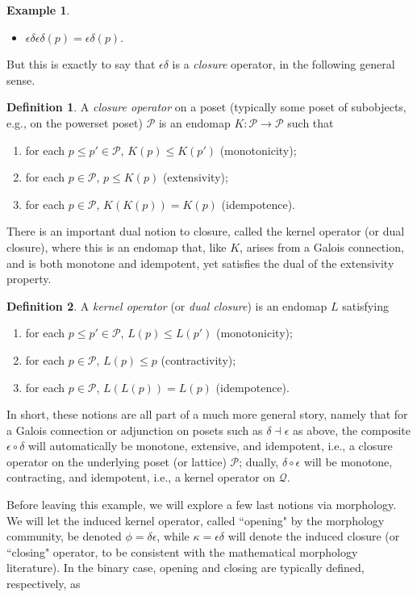 \documentclass[a4paper]{book}
\theoremstyle{definition}
\newtheorem{example}{Example}[section]
\theoremstyle{definition}
\newtheorem{definition}{Definition}[section]
\theoremstyle{definition}
\theoremstyle{theorem}
\theoremstyle{definition}
\begin{document}
\begin{example}
\begin{itemize}
	\item $\epsilon \delta \epsilon \delta (p) = \epsilon \delta (p)$. 
\end{itemize}
But this is exactly to say that $\epsilon \delta$ is a \textit{closure} operator, in the following general sense. 
\begin{definition} 
	A \textit{closure operator} on a poset (typically some poset of subobjects, e.g., on the powerset poset) $\mathcal{P}$ is an endomap $K: \mathcal{P} \rightarrow \mathcal{P}$ such that
	\begin{enumerate}
		\item for each $p \leq p' \in \mathcal{P}$, $K(p) \leq K(p')$ (monotonicity);  
		\item for each $p \in \mathcal{P}$, $p \leq K(p)$ (extensivity); 
		\item for each $p \in \mathcal{P}$, $K(K(p)) = K(p)$ (idempotence).
	\end{enumerate}
\end{definition} \noindent 
There is an important dual notion to closure, called the kernel operator (or dual closure), where this is an endomap that, like $K$, arises from a Galois connection, and is both monotone and idempotent, yet satisfies the dual of the extensivity property.  
\begin{definition}
	A \textit{kernel operator} (or \textit{dual closure}) is an endomap $L$ satisfying 
	\begin{enumerate}
		\item for each $p \leq p' \in \mathcal{P}$, $L(p) \leq L(p')$ (monotonicity);  
		\item for each $p \in \mathcal{P}$, $L(p) \leq p$ (contractivity);
		\item for each $p \in \mathcal{P}$, $L(L(p)) = L(p)$ (idempotence). 
	\end{enumerate}
\end{definition}
In short, these notions are all part of a much more general story, namely that for a Galois connection or adjunction on posets such as $\delta \dashv \epsilon$ as above, the composite $\epsilon \circ \delta$ will automatically be monotone, extensive, and idempotent, i.e., a closure operator on the underlying poset (or lattice) $\mathcal{P}$; dually, $\delta \circ \epsilon$ will be monotone, contracting, and idempotent, i.e., a kernel operator on $\mathcal{Q}$. \par 	
Before leaving this example, we will explore a few last notions via morphology. We will let the induced kernel operator, called ``opening" by the morphology community, be denoted $\phi = \delta \epsilon$, while $\kappa = \epsilon \delta$ will denote the induced closure (or ``closing" operator, to be consistent with the mathematical morphology literature). In the binary case, opening and closing are typically defined, respectively, as 

\end{example}
\end{document}
